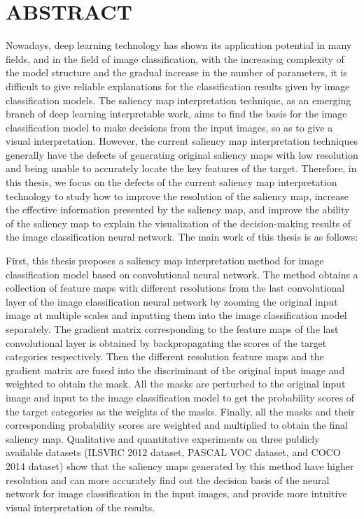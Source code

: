 



\chapter{ABSTRACT}
\xiaosi

Nowadays, deep learning technology has shown its application potential in many fields, and in the field of image classification, with the increasing complexity of the model structure and the gradual increase in the number of parameters, it is difficult to give reliable explanations for the classification results given by image classification models. The saliency map interpretation technique, as an emerging branch of deep learning interpretable work, aims to find the basis for the image classification model to make decisions from the input images, so as to give a visual interpretation. However, the current saliency map interpretation techniques generally have the defects of generating original saliency maps with low resolution and being unable to accurately locate the key features of the target. Therefore, in this thesis, we focus on the defects of the current saliency map interpretation technology to study how to improve the resolution of the saliency map, increase the effective information presented by the saliency map, and improve the ability of the saliency map to explain the visualization of the decision-making results of the image classification neural network. The main work of this thesis is as follows:

First, this thesis proposes a saliency map interpretation method for image classification model based on convolutional neural network. The method obtains a collection of feature maps with different resolutions from the last convolutional layer of the image classification neural network by zooming the original input image at multiple scales and inputting them into the image classification model separately. The gradient matrix corresponding to the feature maps of the last convolutional layer is obtained by backpropagating the scores of the target categories respectively. Then the different resolution feature maps and the gradient matrix are fused into the discriminant of the original input image and weighted to obtain the mask. All the masks are perturbed to the original input image and input to the image classification model to get the probability scores of the target categories as the weights of the masks. Finally, all the masks and their corresponding probability scores are weighted and multiplied to obtain the final saliency map. Qualitative and quantitative experiments on three publicly available datasets (ILSVRC 2012 dataset, PASCAL VOC dataset, and COCO 2014 dataset) show that the saliency maps generated by this method have higher resolution and can more accurately find out the decision basis of the neural network for image classification in the input images, and provide more intuitive visual interpretation of the results.


